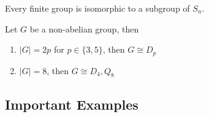 \begin{proposition}
   Every finite group is isomorphic to a subgroup of \(S_n\).
\end{proposition}

\begin{proposition}
   Let \(G\) be a non-abelian group, then
   \begin{enumerate}[label=\roman*, align=Center]
      \item \(|G| = 2p\) for \(p \in \{3,5\}\), then \(G \cong D_p\)
      \item \(|G| = 8\), then \(G \cong D_4, Q_8\)
   \end{enumerate}
\end{proposition}

\subsection{Important Examples}
